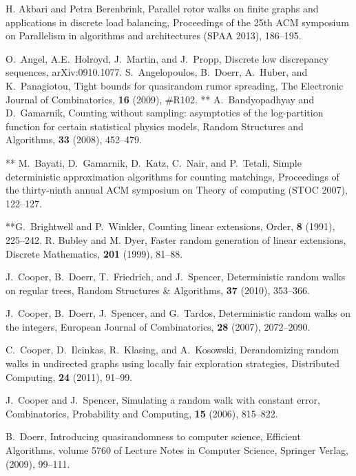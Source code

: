 \documentclass[letter, 11pt]{article}
\newcommand{\1}{\mbox{1}\hspace{-0.25em}\mbox{l}}
\begin{document}
\begin{thebibliography}{99}
 H. Akbari and Petra Berenbrink, 
 Parallel rotor walks on finite graphs and applications in discrete load balancing, 
 Proceedings of the 25th ACM symposium on Parallelism in algorithms and architectures (SPAA 2013), 186--195. 

 O.~Angel, A.E.~Holroyd, J.~Martin, and J.~Propp, 
 Discrete low discrepancy sequences, 
 arXiv:0910.1077. 
 S.~Angelopoulos, B.~Doerr, A.~Huber, and K.~Panagiotou, 
 Tight bounds for quasirandom rumor spreading, 
 The Electronic Journal of Combinatorics, {\bf 16} (2009), {\#}R102.
 ** A.~Bandyopadhyay and D.~Gamarnik, 
 Counting without sampling: asymptotics of the log-partition function for certain statistical physics models, 
 Random Structures and Algorithms, {\bf 33} (2008), 452--479. 

** M.~Bayati, D.~Gamarnik, D.~Katz, C.~Nair, and P.~Tetali, 
 Simple deterministic approximation algorithms for counting matchings, 
 Proceedings of the thirty-ninth annual ACM symposium on Theory of computing (STOC 2007), 
 122--127. 


 **G.~Brightwell and P.~Winkler, 
 Counting linear extensions, 
 Order, {\bf 8} (1991), 225--242. 
\fi
{} 
 R. Bubley and M. Dyer, 
 Faster random generation of linear extensions, 
 Discrete Mathematics, {\bf 201} (1999), 81--88. 

 J.~Cooper, B.~Doerr, T.~Friedrich, and J.~Spencer, 
 Deterministic random walks on regular trees, 
 Random Structures \& Algorithms, {\bf 37} (2010), 353--366. 

 J.~Cooper, B.~Doerr, J.~Spencer, and G.~Tardos, 
 Deterministic random walks on the integers, 
 European Journal of Combinatorics, {\bf 28} (2007), 2072--2090.

 C.~Cooper, D.~Ilcinkas, R.~Klasing, and A.~Kosowski, 
 Derandomizing random walks in undirected graphs using locally fair exploration strategies, 
 Distributed Computing, {\bf 24} (2011), 91--99. 

 J.~Cooper and J.~Spencer, 
 Simulating a random walk with constant error, 
 Combinatorics, Probability and Computing, {\bf 15} (2006), 815--822. 

 B.~Doerr, 
 Introducing quasirandomness to computer science, 
 Efficient Algorithms, volume 5760 of Lecture Notes in Computer Science, Springer Verlag, (2009), 99--111.


\end{thebibliography}
\end{document}
